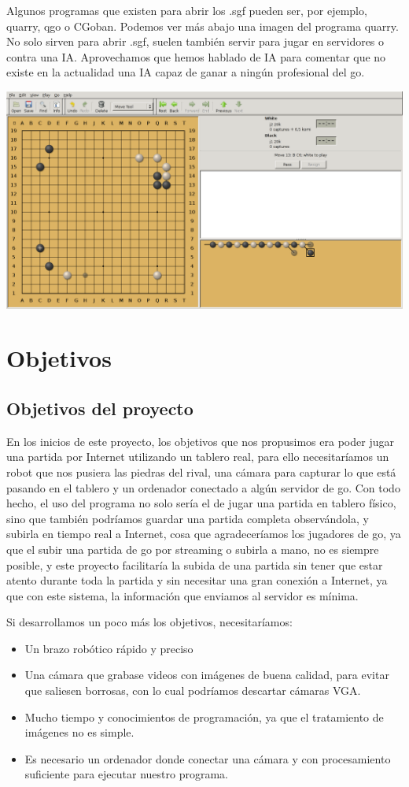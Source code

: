 \documentclass[12pt,a4paper]{report}
\begin{document}
Algunos programas que existen para abrir los .sgf pueden ser, por ejemplo,
quarry, qgo o CGoban. Podemos ver más abajo una imagen del programa quarry. No
solo sirven para abrir .sgf, suelen también servir para jugar en servidores o
contra una IA. Aprovechamos que hemos hablado de IA para comentar que no existe
en la actualidad una IA capaz de ganar a ningún profesional del go.

\includegraphics[scale=0.33]{quarry.png}


\chapter{Objetivos} 

\section{Objetivos del proyecto} 

En los inicios de este proyecto, los objetivos que nos propusimos era poder
jugar una partida por Internet utilizando un tablero real, para ello
necesitaríamos un robot que nos pusiera las piedras del rival, una cámara para
capturar lo que está pasando en el tablero y un ordenador conectado a algún
servidor de go. Con todo hecho, el uso del programa no solo sería el de jugar
una partida en tablero físico, sino que también podríamos guardar una partida
completa observándola, y subirla en tiempo real a Internet, cosa que
agradeceríamos los jugadores de go, ya que el subir una partida de go por
streaming o subirla a mano, no es siempre posible, y este proyecto facilitaría
la subida de una partida sin tener que estar atento durante toda la partida y
sin necesitar una gran conexión a Internet, ya que con este sistema, la
información que enviamos al servidor es mínima. 

Si desarrollamos un poco más los objetivos, necesitaríamos:
\begin{itemize}
    \item Un brazo robótico rápido y preciso
    \item Una cámara que grabase videos con imágenes de buena calidad, para 
    evitar que saliesen borrosas, con lo cual podríamos descartar
    cámaras VGA. 
    \item Mucho tiempo y conocimientos de programación, ya que el tratamiento 
    de imágenes no es simple. 
    \item Es necesario un ordenador donde conectar una cámara y con
    procesamiento suficiente para ejecutar nuestro programa. 
\end{itemize}
\end{document}
